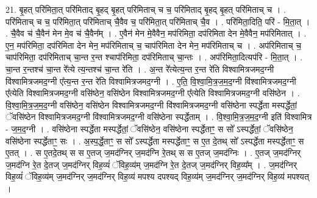 \documentclass[17pt]{extarticle}
\begin{document}
21. बृ॒हत् परि॑मिता॒त् परि॑मिताद् बृ॒हद् बृ॒हत् परि॑मिताच् च च॒ परि॑मिताद् बृ॒हद् बृ॒हत् परि॑मिताच् च । . परि॑मिताच् च च॒ परि॑मिता॒त् परि॑मिताच् चै॒वैव च॒ परि॑मिता॒त् परि॑मिताच् चै॒व । . परि॑मिता॒दिति॒ परि॑ - मि॒ता॒त् । . चै॒वैव च॑ चै॒वैन॑ मेन मे॒व च॑ चै॒वैन᳚म् । . ए॒वैन॑ मेन मे॒वैवैन॒ मप॑रिमिता॒ दप॑रिमिता देन मे॒वैवैन॒ मप॑रिमितात् । . ए॒न॒ मप॑रिमिता॒ दप॑रिमिता देन मेन॒ मप॑रिमिताच् च॒ चाप॑रिमिता देन मेन॒ मप॑रिमिताच् च । . अप॑रिमिताच् च॒ चाप॑रिमिता॒ दप॑रिमिताच् चा॒न्त र॒न्त श्चाप॑रिमिता॒ दप॑रिमिताच् चा॒न्तः । . अप॑रिमिता॒दित्यप॑रि - मि॒ता॒त् । . चा॒न्त र॒न्तश्च॑ चा॒न्त रे᳚त्ये त्य॒न्तश्च॑ चा॒न्त रे॑ति । . अ॒न्त रे᳚त्येत्य॒न्त र॒न्त रे॑ति विश्वामित्रजमद॒ग्नी वि॑श्वामित्रजमद॒ग्नी ए᳚त्य॒न्त र॒न्त रे॑ति विश्वामित्रजमद॒ग्नी । . ए॒ति॒ वि॒श्वा॒मि॒त्र॒ज॒म॒द॒ग्नी वि॑श्वामित्रजमद॒ग्नी ए᳚त्येति विश्वामित्रजमद॒ग्नी वसि॑ष्ठेन॒ वसि॑ष्ठेन विश्वामित्रजमद॒ग्नी ए᳚त्येति विश्वामित्रजमद॒ग्नी वसि॑ष्ठेन । . वि॒श्वा॒मि॒त्र॒ज॒म॒द॒ग्नी वसि॑ष्ठेन॒ वसि॑ष्ठेन विश्वामित्रजमद॒ग्नी वि॑श्वामित्रजमद॒ग्नी वसि॑ष्ठेना स्पर्द्धेता मस्पर्द्धेतां॒ ॅवसि॑ष्ठेन विश्वामित्रजमद॒ग्नी वि॑श्वामित्रजमद॒ग्नी वसि॑ष्ठेना स्पर्द्धेताम् । . वि॒श्वा॒मि॒त्र॒ज॒म॒द॒ग्नी इति॑ विश्वामित्र - ज॒म॒द॒ग्नी । . वसि॑ष्ठेना स्पर्द्धेता मस्पर्द्धेतां॒ ॅवसि॑ष्ठेन॒ वसि॑ष्ठेना स्पर्द्धेताꣳ॒॒ स सो᳚ ऽस्पर्द्धेतां॒ ॅवसि॑ष्ठेन॒ वसि॑ष्ठेना स्पर्द्धेताꣳ॒॒ सः । . अ॒स्प॒र्द्धे॒ताꣳ॒॒ स सो᳚ ऽस्पर्द्धेता मस्पर्द्धेताꣳ॒॒ स ए॒त दे॒तथ् सो᳚ ऽस्पर्द्धेता मस्पर्द्धेताꣳ॒॒ स ए॒तत् । . स ए॒तदे॒तथ् स स ए॒तज् ज॒मद॑ग्निर् ज॒मद॑ग्नि रे॒तथ् स स ए॒तज् ज॒मद॑ग्निः । . ए॒तज् ज॒मद॑ग्निर् ज॒मद॑ग्नि रे॒त दे॒तज् ज॒मद॑ग्निर् विह॒व्यं॑ ॅविह॒व्य॑म् ज॒मद॑ग्नि रे॒त दे॒तज् ज॒मद॑ग्निर् विह॒व्य᳚म् । . ज॒मद॑ग्निर् विह॒व्यं॑ ॅविह॒व्य॑म् ज॒मद॑ग्निर् ज॒मद॑ग्निर् विह॒व्य॑ मपश्य दपश्यद् विह॒व्य॑म् ज॒मद॑ग्निर् ज॒मद॑ग्निर् विह॒व्य॑ मपश्यत् । \newline
\end{document}
